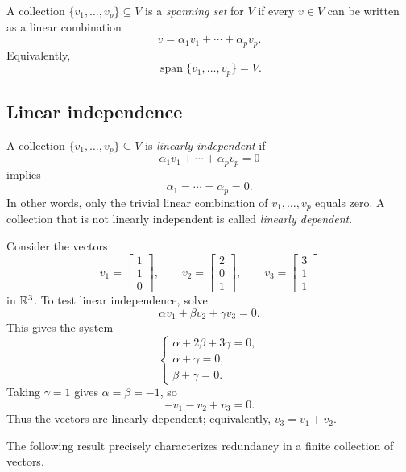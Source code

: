 \begin{definition}
  A collection $\{v_1,\ldots,v_p\}\subseteq V$ is a \emph{spanning set}
  for $V$ if every $v\in V$ can be written as a linear combination
  \[
    v=\alpha_1v_1+\cdots+\alpha_pv_p.
  \]
  Equivalently,
  \[
    \operatorname{span}\{v_1,\ldots,v_p\}=V.
  \]
\end{definition}

\subsection{Linear independence}

\begin{definition}
  A collection $\{v_1,\ldots,v_p\}\subseteq V$ is \emph{linearly
  independent} if
  \[
    \alpha_1v_1+\cdots+\alpha_pv_p=0
  \]
  implies
  \[
    \alpha_1=\cdots=\alpha_p=0.
  \]
  In other words, only the trivial linear combination of
  $v_1,\ldots,v_p$ equals zero. A collection that is not linearly
  independent is called \emph{linearly dependent}.
\end{definition}

\begin{example}
  Consider the vectors
  \[
    v_1=\begin{bmatrix}1\\1\\0\end{bmatrix},
    \qquad
    v_2=\begin{bmatrix}2\\0\\1\end{bmatrix},
    \qquad
    v_3=\begin{bmatrix}3\\1\\1\end{bmatrix}
  \]
  in $\mathbb{R}^3$. To test linear independence, solve
  \[
    \alpha v_1+\beta v_2+\gamma v_3=0.
  \]
  This gives the system
  \[
    \begin{cases}
      \alpha+2\beta+3\gamma=0,\\
      \alpha+\gamma=0,\\
      \beta+\gamma=0.
    \end{cases}
  \]
  Taking $\gamma=1$ gives $\alpha=\beta=-1$, so
  \[
    -v_1-v_2+v_3=0.
  \]
  Thus the vectors are linearly dependent; equivalently,
  $v_3=v_1+v_2$.
\end{example}

The following result precisely characterizes redundancy in a finite
collection of vectors.

